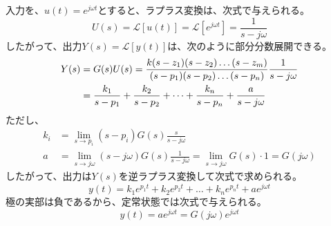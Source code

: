 \documentclass[book]{jlreq}
\begin{document}
入力を、$u(t)=e^{j\omega t}$とすると、ラプラス変換は、次式で与えられる。
%
\begin{equation}
    U(s)= \mathcal{L}[u(t)]=\mathcal{L}[e^{j\omega t}]=\frac{1}{s-j\omega}
\end{equation}
%
したがって、出力$Y(s)=\mathcal{L}[y(t)]$は、次のように部分分数展開できる。
%
\begin{equation}
    \begin{split}
        Y(s) &= G(s)U(s) = \frac{k(s-z_1)(s-z_2)\dots(s-z_m)}{(s-p_1)(s-p_2)\dots(s-p_n)}\frac{1}{s-j\omega} \\
        &= \frac{k_1}{s-p_1}+\frac{k_2}{s-p_2}+\dots+\frac{k_n}{s-p_n}+\frac{a}{s-j\omega}\notag
    \end{split}
\end{equation}
%
ただし、
%
\begin{equation}
    \begin{split}
        k_i &= \lim_{s \to p_i}(s-p_i)G(s)\frac{s}{s-j\omega} \\
        a &=\lim_{s \to j\omega}(s-j\omega)G(s)\frac{1}{s-j\omega} =\lim_{s \to j\omega}G(s)\cdot 1=G(j\omega)
    \end{split}
\end{equation}
%
したがって、出力は$Y(s)$を逆ラプラス変換して次式で求められる。
%
\begin{equation}
    y(t)=k_1 e^{p_1 t}+k_2 e^{p_2 t}+ \dots + k_n e^{p_n t} + a e^{j\omega t}
\end{equation}
%
極の実部は負であるから、定常状態では次式で与えられる。
%
\begin{equation}
    y(t) = a e^{j\omega t} = G(j\omega) e^{j\omega t}
\end{equation}
%
\end{document}
